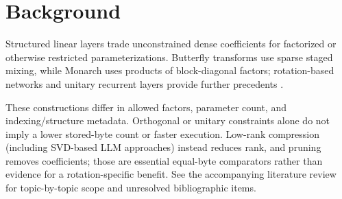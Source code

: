 \section{Background}
\label{sec:background}
Structured linear layers trade unconstrained dense coefficients for factorized or otherwise restricted parameterizations. Butterfly transforms use sparse staged mixing, while Monarch uses products of block-diagonal factors; rotation-based networks and unitary recurrent layers provide further precedents \citep{dao2019butterfly,dao2022monarch,choromanski2019kama,jing2017eunn}.

These constructions differ in allowed factors, parameter count, and indexing/structure metadata. Orthogonal or unitary constraints alone do not imply a lower stored-byte count or faster execution. Low-rank compression (including SVD-based LLM approaches) instead reduces rank, and pruning removes coefficients; those are essential equal-byte comparators rather than evidence for a rotation-specific benefit. See the accompanying literature review for topic-by-topic scope and unresolved bibliographic items.
